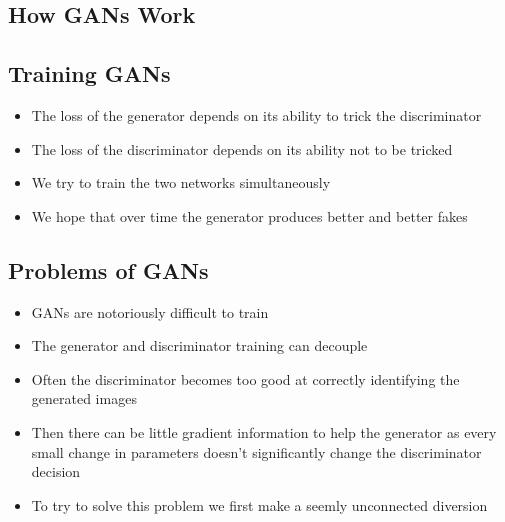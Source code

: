 
\begin{slide}
\section{How GANs Work}

\pb\pause{}
\begin{center}
  \pause
\end{center}
\end{slide}


\begin{slide}
\section{Training GANs}

\begin{PauseHighLight}
  \begin{itemize}
  \item The loss of the generator depends on its ability to trick the
    discriminator\pause
  \item The loss of the discriminator depends on its ability not to be
    tricked\pause
  \item We try to train the two networks simultaneously\pause
  \item We hope that over time the generator produces better and
    better fakes\pause
  \end{itemize}
\end{PauseHighLight}

\end{slide}

\begin{slide}
\section{Problems of GANs}

\begin{PauseHighLight}
  \begin{itemize}
  \item GANs are notoriously difficult to train\pause
  \item The generator and discriminator training can decouple\pause
  \item Often the discriminator becomes too good at correctly
    identifying the generated images\pause
  \item Then there can be little gradient information to help the
    generator as every small change in parameters doesn't significantly
    change the discriminator decision\pause
  \item To try to solve this problem we first make a seemly
    unconnected diversion\pause
  \end{itemize}
\end{PauseHighLight}
\end{slide}

